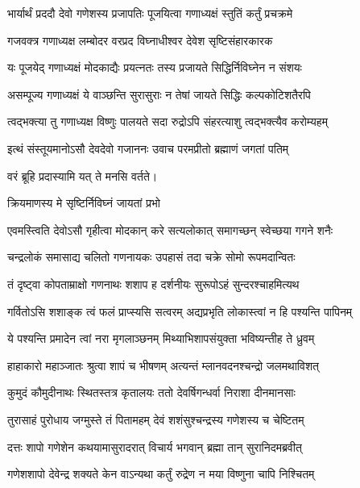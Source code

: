 \begin{center}
\twolineshloka
{भार्यार्थं प्रददौ देवो गणेशस्य प्रजापतिः}
{पूजयित्वा गणाध्यक्षं स्तुतिं कर्तुं प्रचक्रमे}%


\twolineshloka
{गजवक्त्र गणाध्यक्ष लम्बोदर वरप्रद}
{विघ्नाधीश्वर देवेश सृष्टिसंहारकारक}%

\twolineshloka
{यः पूजयेद् गणाध्यक्षं मोदकाद्यैः प्रयत्नतः}
{तस्य प्रजायते सिद्धिर्निविघ्नेन न संशयः}%

\twolineshloka
{असम्पूज्य गणाध्यक्षं ये वाञ्छन्ति सुरासुराः}
{न तेषां जायते सिद्धिः कल्पकोटिशतैरपि}%

\twolineshloka
{त्वद्भक्त्या तु गणाध्यक्ष विष्णुः पालयते सदा}
{रुद्रोऽपि संहरत्याशु त्वद्भक्त्यैव करोम्यहम्}%

\twolineshloka
{इत्थं संस्तूयमानोऽसौ देवदेवो गजाननः}
{उवाच परमप्रीतो ब्रह्माणं जगतां पतिम्}%


{वरं ब्रूहि प्रदास्यामि यत् ते मनसि वर्तते।}

\onelineshloka
{क्रियमाणस्य मे सृष्टिर्निविघ्नं जायतां प्रभो}%

\twolineshloka
{एवमस्त्विति देवोऽसौ गृहीत्वा मोदकान् करे}
{सत्यलोकात् समागच्छन् स्वेच्छया गगने शनैः}%

\twolineshloka
{चन्द्रलोकं समासाद्य चलितो गणनायकः}
{उपहासं तदा चक्रे सोमो रूपमदान्वितः}%

\twolineshloka
{तं दृष्ट्वा कोपताम्राक्षो गणनाथः शशाप ह}
{दर्शनीयः सुरूपोऽहं सुन्दरश्चाहमित्यथ}%

\twolineshloka
{गर्वितोऽसि शशाङ्क त्वं फलं प्राप्स्यसि सत्वरम्}
{अद्यप्रभृति लोकास्त्वां न हि पश्यन्ति पापिनम्}%

\twolineshloka
{ये पश्यन्ति प्रमादेन त्वां नरा मृगलाञ्छनम्}
{मिथ्याभिशापसंयुक्ता भविष्यन्तीह ते ध्रुवम्}%

\twolineshloka
{हाहाकारो महाञ्जातः श्रुत्वा शापं च भीषणम्}
{अत्यन्तं म्लानवदनश्चन्द्रो जलमथाविशत्}%

\twolineshloka
{कुमुदं कौमुदीनाथः स्थितस्तत्र कृतालयः}
{ततो देवर्षिगन्धर्वा निराशा दीनमानसाः}%

\twolineshloka
{तुरासाहं पुरोधाय जग्मुस्ते तं पितामहम्}
{देवं शशंसुश्चन्द्रस्य गणेशस्य च चेष्टितम्}%

\twolineshloka
{दत्तः शापो गणेशेन कथयामासुरादरात्}
{विचार्य भगवान् ब्रह्मा तान् सुरानिदमब्रवीत्}%

\twolineshloka
{गणेशशापो देवेन्द्र शक्यते केन वाऽन्यथा}
{कर्तुं रुद्रेण न मया विष्णुना चापि निश्चितम्}%


\end{center}
